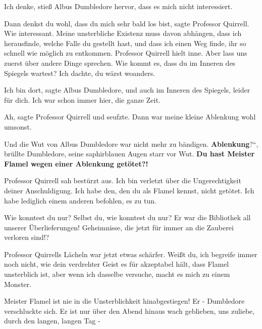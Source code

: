 \glqq{}Ich denke\grqq{}, stieß Albus Dumbledore hervor, \glqq{}dass es mich nicht
interessiert.\grqq{}

\glqq{}Dann denkst du wohl, dass du mich sehr bald los bist\grqq{}, sagte
Professor Quirrell. \glqq{}Wie interessant. Meine unsterbliche Existenz muss
davon abhängen, dass ich herausfinde, welche Falle du gestellt hast, und dass
ich einen Weg finde, ihr so schnell wie möglich zu entkommen.\grqq{} Professor
Quirrell hielt inne. \glqq{}Aber lass uns zuerst über andere Dinge sprechen. Wie
kommt es, dass du im Inneren des Spiegels wartest? Ich dachte, du wärst
woanders.\grqq{}

\glqq{}Ich bin dort\grqq{}, sagte Albus Dumbledore, \glqq{}und auch im Inneren des
Spiegels, leider für dich. Ich war schon immer hier, die ganze Zeit.\grqq{}

\glqq{}Ah\grqq{}, sagte Professor Quirrell und seufzte. \glqq{}Dann war meine
kleine Ablenkung wohl umsonst.\grqq{}

Und die Wut von Albus Dumbledore war nicht mehr zu bändigen. \glqq{}
\textbf{Ablenkung}?“\grqq{}, brüllte Dumbledore, seine saphirblauen Augen starr
vor Wut. \glqq{}\textbf{Du hast Meister Flamel wegen einer Ablenkung
getötet?!}\grqq{}

Professor Quirrell sah bestürzt aus. \glqq{}Ich bin verletzt über die
Ungerechtigkeit deiner Anschuldigung. Ich habe den, den du als Flamel kennst,
nicht getötet. Ich habe lediglich einem anderen befohlen, es zu tun.\grqq{}

\glqq{}Wie konntest du nur? Selbst du, wie konntest du nur? Er war die Bibliothek
all unserer Überlieferungen! Geheimnisse, die jetzt für immer an die Zauberei
verloren sind!?\grqq{}

Professor Quirrells Lächeln war jetzt etwas schärfer. \glqq{}Weißt du, ich
begreife immer noch nicht, wie dein verdrehter Geist es für akzeptabel hält,
dass Flamel unsterblich ist, aber wenn ich dasselbe versuche, macht es mich zu
einem Monster.\grqq{}

\glqq{}Meister Flamel ist nie in die Unsterblichkeit hinabgestiegen! Er -\grqq{}
Dumbledore verschluckte sich. \glqq{}Er ist nur über den Abend hinaus wach
geblieben, uns zuliebe, durch den langen, langen Tag -\grqq{}

